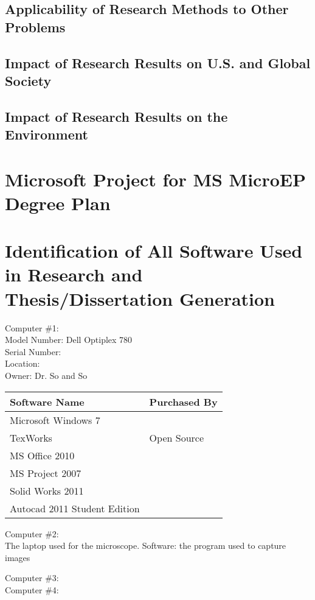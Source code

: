  \section{Applicability of Research Methods to Other Problems}
 \section{Impact of Research Results on U.S. and Global Society}
 \section{Impact of Research Results on the Environment}
 
 \chapter{Microsoft Project for MS MicroEP Degree Plan}
 
 \chapter{Identification of All Software Used in Research and Thesis/Dissertation Generation}
 Computer \#1:\\
 Model Number: Dell Optiplex 780\\
 Serial Number: \\
 Location:\\
 Owner: Dr. So and So\\
 \begin{tabular}{ll}
 	Software Name & Purchased By\\
 	\hline
 	Microsoft Windows 7 & \\
 	TexWorks & Open Source\\
 	MS Office 2010 & \\
 	MS Project 2007 & \\
 	Solid Works 2011 & \\
 	Autocad 2011 Student Edition & \\
 \end{tabular}
 
 Computer \#2:\\
 The laptop used for the microscope.
 Software: the program used to capture images
 
 Computer \#3:\\
 
 Computer \#4:\\
 

